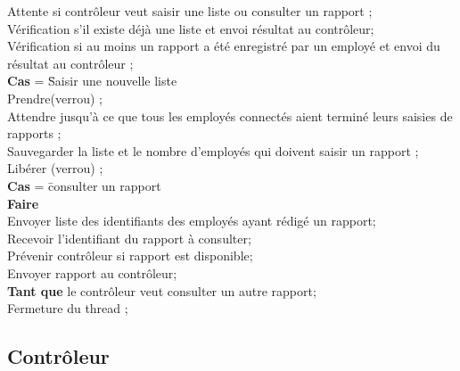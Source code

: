 \begin{tabbing}

Attente si contrôleur veut saisir une liste ou consulter un rapport ;\\

Vérification s'il existe déjà une liste et envoi résultat au contrôleur;\\

Vérification si au moins un rapport a été enregistré par un employé  et envoi du résultat au contrôleur ;\\

\textbf{Cas} = \= Saisir une nouvelle liste \\

\> Prendre(verrou) ;\\

\> Attendre jusqu'à ce que tous les employés connectés aient terminé leurs saisies de rapports ;\\

\> Sauvegarder la liste et le nombre d'employés qui doivent saisir un rapport ;\\

\> Libérer (verrou) ; \\

\textbf{Cas} = \= consulter un rapport \\

\> \textbf{Faire} \= \\

\> \> Envoyer liste des identifiants des employés ayant rédigé un rapport; \\

\> \> Recevoir l’identifiant du rapport à consulter;\\

\> \> Prévenir contrôleur si rapport est disponible;\\

\> \> Envoyer rapport au contrôleur;\\

\> \textbf{Tant que} le contrôleur veut consulter un autre rapport;\\

Fermeture du thread ;

\end{tabbing}


\subsection{Contrôleur}


